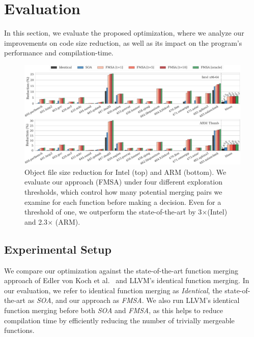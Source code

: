 \section{Evaluation}


In this section, we evaluate the proposed optimization, where we analyze our
improvements on code size reduction, as well as its impact on the program's
performance and compilation-time.


\begin{figure}[t!]
  \centering
  \includegraphics[width=\linewidth]{figs/code-size-reduction-spec.pdf}
	\caption{Object file size reduction for Intel (top) and ARM (bottom). We evaluate our approach (FMSA) under four different exploration thresholds, which
      control how many potential merging pairs we examine for each function before making a decision. Even for a threshold of one, we outperform the state-of-the-art
	  by 3$\times$(Intel) and 2.3$\times$ (ARM).}
  \label{fig:reduction-obj}
\end{figure}


\subsection{Experimental Setup}
We compare our optimization against the state-of-the-art function merging approach of Edler von Koch et al.~\cite{edler14} and LLVM's identical
function merging. In our evaluation, we refer to identical function merging as \textit{Identical}, the state-of-the-art as \textit{SOA}, and our
approach as \textit{FMSA}.
We also run LLVM's identical function merging before both \textit{SOA} and \textit{FMSA}, as this helps to reduce
compilation time by efficiently reducing the number of trivially mergeable functions.

